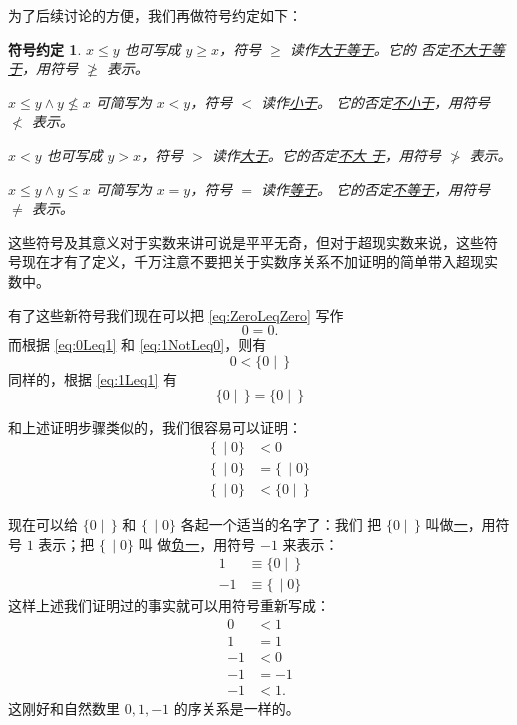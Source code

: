 \documentclass[cs4size,a4paper,adobefonts]{ctexart}
\newtheorem*{symbolDef}{符号约定}
\newcommand{\pname}[1]{\underline{#1}}
\numberwithin{equation}{section}
\begin{document}
为了后续讨论的方便，我们再做符号约定如下：
\begin{symbolDef}
  $x\leq y$ 也可写成 $y\geq x$，符号 $\geq$ 读作\pname{大于等于}。它的
  否定\pname{不大于等于}，用符号 $\ngeq$ 表示。

  $x\leq y\wedge y\nleq x$ 可简写为 $x<y$，符号 $<$ 读作\pname{小于}。
  它的否定\pname{不小于}，用符号 $\nless$ 表示。

  $x<y$ 也可写成 $y>x$，符号 $>$ 读作\pname{大于}。它的否定\pname{不大
    于}，用符号 $\ngtr$ 表示。

  $x\leq y \wedge y \leq x$ 可简写为 $x=y$，符号 $=$ 读作\pname{等于}。
  它的否定\pname{不等于}，用符号 $\neq$ 表示。
\end{symbolDef}

这些符号及其意义对于实数来讲可说是平平无奇，但对于超现实数来说，这些符
号现在才有了定义，千万注意不要把关于实数序关系不加证明的简单带入超现实
数中。

有了这些新符号我们现在可以把 \eqref{eq:ZeroLeqZero} 写作
\begin{equation*}
  0=0.
\end{equation*}
而根据 \eqref{eq:0Leq1} 和 \eqref{eq:1NotLeq0}，则有
\begin{equation*}
  0 < \{0\mid\,\}
\end{equation*}
同样的，根据 \eqref{eq:1Leq1} 有
\begin{equation*}
  \{0\mid\,\}=\{0\mid\,\}
\end{equation*}

和上述证明步骤类似的，我们很容易可以证明：
\begin{align*}
  \{\,\mid 0\} &< 0\\
  \{\,\mid 0\} &= \{\,\mid 0\}\\
  \{\,\mid 0\} &< \{0\mid \,\}
\end{align*}

现在可以给 $\{0\mid \,\}$ 和 $\{\,\mid 0\}$ 各起一个适当的名字了：我们
把 $\{0\mid \,\}$ 叫做\pname{一}，用符号 $1$ 表示；把 $\{\,\mid 0\}$ 叫
做\pname{负一}，用符号 $-1$ 来表示：
\begin{align*}
  1 &\equiv \{0\mid \,\}\\
  -1 &\equiv \{\,\mid 0\}
\end{align*}
这样上述我们证明过的事实就可以用符号重新写成：
\begin{align*}
  0 & < 1\\
  1 & = 1\\
  -1 & < 0\\
  -1 & = -1\\
  -1 & < 1.
\end{align*}
这刚好和自然数里 $0,1,-1$ 的序关系是一样的。
\end{document}
